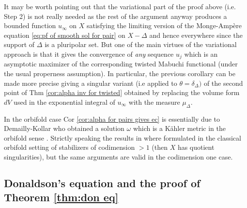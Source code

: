\documentclass[11pt,oneside,english]{amsart}
\numberwithin{equation}{section}
\numberwithin{figure}{section}
\theoremstyle{plain}
\theoremstyle{plain}
\theoremstyle{plain}
\theoremstyle{plain}
\theoremstyle{remark}
\theoremstyle{definition}
\begin{document}
It may be worth pointing out that the variational part of the proof
above (i.e. Step 2) is not really needed as the rest of the argument
anyway produces a bounded function $u_{\infty}$ on $X$ satisfying
the limiting version of the Monge-Ampère equation \ref{eq:pf of smooth sol for pair}
on $X-\Delta$ and hence everywhere since the support of $\Delta$
is a pluripolar set. But one of the main virtues of the variational
approach is that it gives the convergence of \emph{any} sequence $u_{j}$
which is an asymptotic maximizer of the corresponding twisted Mabuchi
functional (under the usual properness assumption). In particular,
the previous corollary can be made more precise giving a singular
variant (i.e applied to $\theta=\delta_{\Delta})$ of the second point
of Thm \ref{cor:alpha inv for twisted} obtained by replacing the
volume form $dV$ used in the exponential integral of $u_{\infty}$
with the measure $\mu_{\Delta}.$

In the orbifold case Cor \ref{cor:alpha for pairs gives ec} is essentially
due to Demailly-Kollar who obtained a solution $\omega$ which is
a Kähler metric in the orbifold sense \cite{d-j}. Strictly speaking
the results in \cite{d-j} where formulated in the classical orbifold
setting of stabilizers of codimension $>1$ (then $X$ has quotient
singularities), but the same arguments are valid in the codimension
one case.

\subsection{\label{sec:Donaldson's-equation-and}Donaldson's equation and the
proof of Theorem \ref{thm:don eq} }
\end{document}
